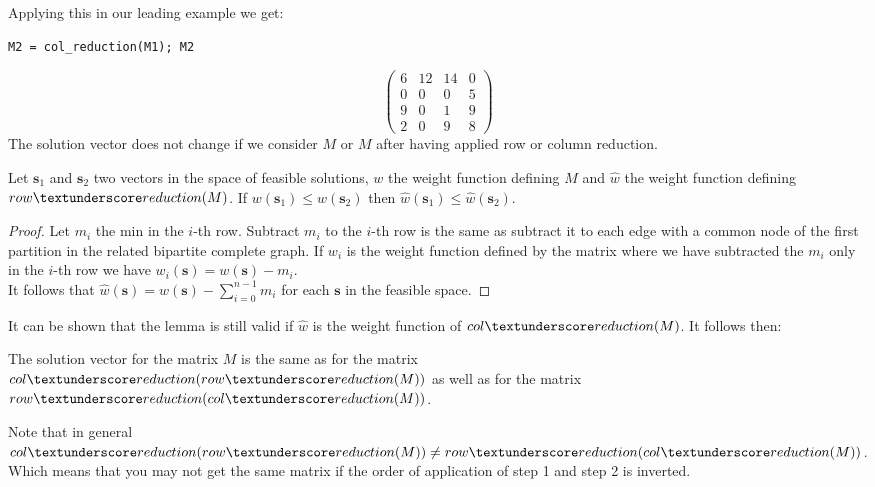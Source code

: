 \documentclass[12pt]{ClasseMatematicamente}
\begin{document}
\noindent
Applying this in our leading example we get:
\begin{small}
 \begin{verbatim}
M2 = col_reduction(M1); M2
\end{verbatim}
\end{small}
\begin{equation}\label{matrix_M2}
\left(\begin{array}{rrrr}
6 & 12 & 14 & 0 \\
0 & 0 & 0 & 5 \\
9 & 0 & 1 & 9 \\
2 & 0 & 9 & 8
\end{array}\right)
\end{equation}
The solution vector does not change if we consider $M$ or $M$ after having applied row or column reduction. 
\begin{lemma}
 Let $\mathbf{s}_1$ and $\mathbf{s}_2$ two vectors in the space of feasible solutions, $w$ the weight function defining $M$ and $\hat{w}$ the weight function defining $row\textunderscore reduction(M)$. If $w(\mathbf{s}_1) \leq w(\mathbf{s}_2)$ then $\hat{w}(\mathbf{s}_1) \leq \hat{w}(\mathbf{s}_2)$.
\end{lemma}
\begin{proof}
 Let $m_{i}$ the min in the $i$-th row. Subtract $m_{i}$ to the $i$-th row is the same as subtract it to each edge with a common node of the first partition in the related bipartite complete graph. If $w_{i}$ is the weight function defined by the matrix where we have subtracted the $m_{i}$ only in the $i$-th row we have $w_{i}(\mathbf{s}) = w(\mathbf{s}) - m_{i}$.\\
 It follows that $\hat{w}(\mathbf{s}) = w(\mathbf{s}) - \sum_{i=0}^{n-1} m_{i}$ for each $\mathbf{s}$ in the feasible space.
\end{proof}
It can be shown that the lemma is still valid if $\hat{w}$ is the weight function of $col\textunderscore reduction(M)$. It follows then:
\begin{theor}
 The solution vector for the matrix $M$ is the same as for the matrix \\
 $col\textunderscore reduction(row\textunderscore reduction(M))$ as well as for the matrix 
 $row\textunderscore reduction(col\textunderscore reduction(M))$.
\end{theor}
Note that in general $col\textunderscore reduction(row\textunderscore reduction(M)) \neq row\textunderscore reduction(col\textunderscore reduction(M))$. Which means that you may not get the same matrix if the order of application of step 1 and step 2 is inverted.
\end{document}
